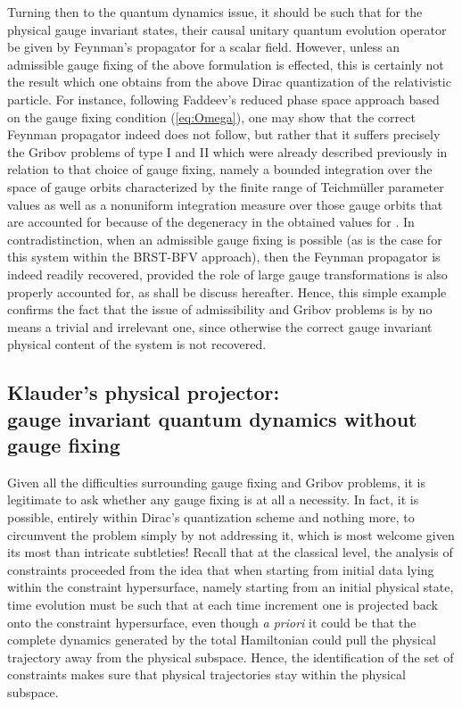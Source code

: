 \documentclass[a4paper,11pt]{article}
\begin{document}
Turning then to the quantum dynamics issue, it should be such that for
the physical gauge invariant states, their causal unitary quantum evolution
operator be given by Feynman's propagator for a scalar field. However,
unless an admissible gauge fixing of the above formulation is effected,
this is certainly not the result which one obtains from the above Dirac
quantization of the relativistic particle. For instance, following
Faddeev's reduced phase space approach based on the gauge fixing
condition (\ref{eq:Omega}), one may show\cite{JG1,JG4,JG5} that the correct 
Feynman propagator
indeed does not follow, but rather that it suffers precisely the Gribov 
problems of type I and II which were already described previously in
relation to that choice of gauge fixing, namely a bounded integration over 
the space of gauge orbits characterized by the finite
range of Teichm\"uller parameter values \myHighlight{$\gamma$}\coordHE{} as well as a nonuniform
integration measure over those gauge orbits that are accounted for because
of the degeneracy in the obtained values for \myHighlight{$\gamma$}\coordHE{}.
In contradistinction, when an admissible gauge fixing is possible
(as is the case for this system within the BRST-BFV 
approach\cite{JG1,JG4,JG5}), then the
Feynman propagator is indeed readily recovered, provided the role
of large gauge transformations is also properly accounted for, as shall
be discuss hereafter. Hence, this simple example confirms the fact that the
issue of admissibility and Gribov problems is by no means a trivial and
irrelevant one, since otherwise the correct gauge invariant physical
content of the system is not recovered.

\subsection{Klauder's physical projector:\\
gauge invariant quantum dynamics without gauge fixing}
\label{Subsect5.5}

Given all the difficulties surrounding gauge fixing and Gribov problems,
it is legitimate to ask whether any gauge fixing is at all a necessity.
In fact, it is possible, entirely within Dirac's quantization scheme
and nothing more, to circumvent the problem simply by not addressing it,
which is most welcome given its most than intricate subtleties! Recall
that at the classical level, the analysis of constraints proceeded from
the idea\cite{Klaud1} that when starting from initial data lying within the
constraint hypersurface, namely starting from an initial physical state,
time evolution must be such that at each time increment one is projected
back onto the constraint hypersurface, even though {\sl a priori\/} it could
be that the complete dynamics generated by the total Hamiltonian could
pull the physical trajectory away from the physical subspace. Hence,
the identification of the set of constraints makes sure that physical
trajectories stay within the physical subspace. 
\end{document}
